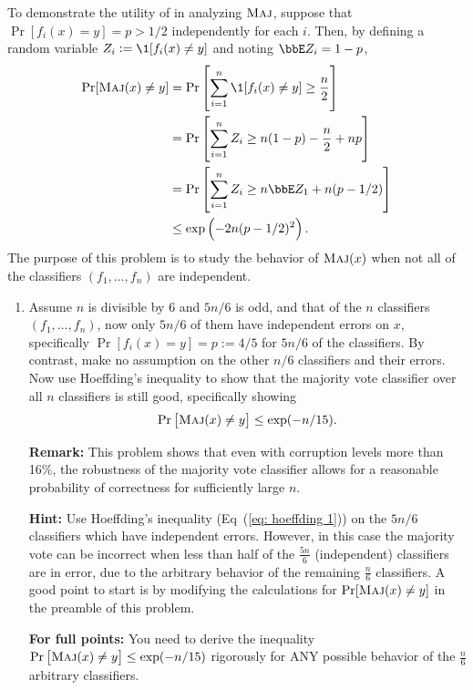 \begin{enumerate}[font={\Large\bfseries},left=0pt]
\begin{Q}
     To demonstrate the utility of  in analyzing $\textsc{Maj}$, suppose
     that $\Pr[ f_i(x) = y ] = p > 1/2$ independently for each $i$.
     Then, by defining a random variable $Z_i := \1[ f_i(x) \neq y]$
     and noting $\bbE Z_i = 1 - p$,
     \begin{align*}
       \Pr[\maj(x) \neq y]
       &=
       \Pr\sbr{ \sum_{i=1}^n \1[ f_i(x) \neq y] \geq \frac n 2 }
       \\
       &=
       \Pr\sbr{ \sum_{i=1}^n Z_i \geq n(1-p) - \frac n 2 + np }
       \\
       &=
       \Pr\sbr{ \sum_{i=1}^n Z_i \geq n \bbE Z_1 + n(p-1/2) }
       \\
       &\leq
       \exp\del{ -2n(p-1/2)^2 }.
     \end{align*}
     The purpose of this problem is to study the behavior of $\textsc{Maj}(x)$ when not all of the classifiers $(f_1,\ldots,f_n)$ are independent.
     \begin{enumerate}
       \item
         Assume $n$ is divisible by $6$ and $5n/6$ is odd,
         and that of the $n$ classifiers $(f_1,\ldots,f_n)$,
         now only $5n/6$ of them have independent errors on $x$,
         specifically $\Pr[f_i(x) = y] = p := 4/5$ for $5n/6$ of the classifiers.
         By contrast, make no assumption on the other $n/6$ classifiers and their errors. Now use Hoeffding's inequality to show that the majority vote classifier
         over all $n$ classifiers is still good, specifically showing
         \[
           \Pr\sbr{ \maj(x) \neq y } \leq \exp(-n / 15).
         \]

    \textbf{Remark:} This problem shows that even with corruption levels more than 16\%, the robustness of the majority vote classifier allows for a reasonable probability of correctness for sufficiently large $n$.
  
  \textbf{Hint:} Use Hoeffding's inequality (Eq~(\ref{eq: hoeffding 1})) on the $5n/6$ classifiers which have independent errors. However, in this case the majority vote can be incorrect when less than half of the $\frac{5n}{6}$ (independent) classifiers are in error, due to the arbitrary behavior of the remaining $\frac{n}{6}$ classifiers. A good point to start is by modifying the calculations for $\Pr[\textsc{Maj}(x) \neq y]$ in the preamble of this problem.
  
  \textbf{For full points:} You need to derive the inequality $\Pr\sbr{ \maj(x) \neq y } \leq \exp(-n / 15)$ rigorously for ANY possible behavior of the $\frac{n}{6}$ arbitrary classifiers.



\end{enumerate}
\end{Q}
\end{enumerate}
